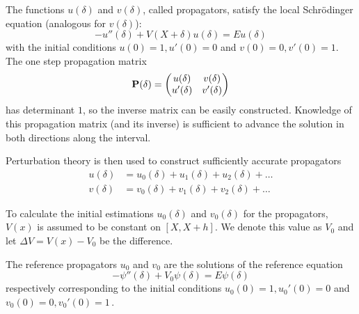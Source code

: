 The functions \(u(\delta)\) and \(v(\delta)\), called propagators,
satisfy the local Schrödinger equation (analogous for \(v(\delta)\)):
\begin{equation}
    - u''(\delta) + V(X+\delta) u(\delta) = E u(\delta) \label{eq:loc}
\end{equation}
with the initial conditions \(u(0) = 1, u'(0)=0\) and
\(v(0) = 0, v'(0)=1\). The one step propagation matrix \[
    \vb{P}(\delta) = \begin{pmatrix} u(\delta) & v(\delta) \\ u'(\delta) & v'(\delta) \end{pmatrix}
\] has determinant \(1\), so the inverse matrix can be easily
constructed. Knowledge of this propagation matrix (and its inverse) is sufficient to
advance the solution in both directions along the interval.

Perturbation theory is then used to construct sufficiently accurate propagators
\begin{align*}
    u(\delta) & = u_0(\delta) + u_1(\delta) + u_2(\delta) + \dots \\
    v(\delta) & = v_0(\delta) + v_1(\delta) + v_2(\delta) + \dots
\end{align*}


To calculate the initial estimations $u_0(\delta)$ and $v_0(\delta)$ for
the propagators, \(V(x)\) is assumed to be constant on \([X, X+h]\).
We denote this value as \(V_0\) and let \(\Delta V = V(x) - V_0\) be the difference.


The reference propagators \(u_0\) and \(v_0\) are the solutions of the reference equation
\[ -\psi''(\delta) + V_0 \psi(\delta) = E \psi(\delta) \]
respectively corresponding to the initial conditions
\(u_0(0) = 1, u_0'(0) = 0\) and
\(v_0(0) = 0, v_0'(0) = 1\,.\)
%

